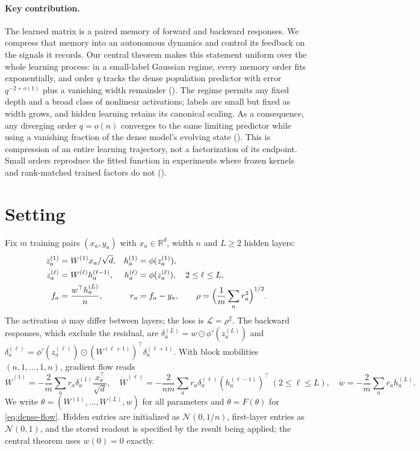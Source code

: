 \documentclass[11pt]{article}
\theoremstyle{definition}
\theoremstyle{remark}
\newcommand{\R}{\mathbb{R}}
\newcommand{\cL}{\mathcal{L}}
\newcommand{\od}{\mathbin{\odot}}
\begin{document}
\paragraph{Key contribution.}
The learned matrix is a paired memory of forward and backward responses.
We compress that memory into an autonomous dynamics and control its feedback
on the signals it records.  Our central theorem makes this statement uniform
over the whole learning process: in a small-label Gaussian regime, every
memory order fits exponentially, and order $q$ tracks the dense population
predictor with error $q^{-2+o(1)}$ plus a vanishing width remainder
().  The regime permits any fixed depth and a broad class
of nonlinear activations; labels are small but fixed as width grows, and
hidden learning retains its canonical scaling.  As a consequence, any
diverging order $q=o(n)$ converges to the same limiting predictor while
using a vanishing fraction of the dense model's evolving state
().  This is compression of an entire learning
trajectory, not a factorization of its endpoint.  Small orders reproduce
the fitted function in experiments where frozen kernels and rank-matched
trained factors do not ().

\section{Setting}
\label{sec:setting}

Fix $m$ training pairs $(x_a,y_a)$ with $x_a\in\R^d$, width $n$ and $L\ge2$
hidden layers:
\begin{align}
 z_a^{(1)}&=W^{(1)}x_a/\sqrt d,& h_a^{(1)}&=\phi(z_a^{(1)}),\nonumber\\
 z_a^{(\ell)}&=W^{(\ell)}h_a^{(\ell-1)},&
 h_a^{(\ell)}&=\phi(z_a^{(\ell)}),\quad 2\le\ell\le L,\\
 f_a&=\frac{w^\top h_a^{(L)}}{n},& r_a&=f_a-y_a,\qquad
 \rho=\Bigl(\frac1m\sum_a r_a^2\Bigr)^{1/2}.\nonumber
\end{align}
The activation $\phi$ may differ between layers; the loss is $\cL=\rho^2$.  The
backward responses, which exclude the residual, are
$\delta_a^{(L)}=w\od\phi'(z_a^{(L)})$ and
$\delta_a^{(\ell)}=\phi'(z_a^{(\ell)})\od(W^{(\ell+1)})^\top\delta_a^{(\ell+1)}$.
With block mobilities $(n,1,\ldots,1,n)$, gradient flow reads
\begin{equation}
 \dot W^{(1)}=-\frac2m\sum_a r_a\delta_a^{(1)}\frac{x_a^\top}{\sqrt d},\quad
 \dot W^{(\ell)}=-\frac{2}{nm}\sum_a r_a\delta_a^{(\ell)}
 (h_a^{(\ell-1)})^\top\ (2\le\ell\le L),\quad
 \dot w=-\frac2m\sum_a r_a h_a^{(L)}.\label{eq:dense-flow}
\end{equation}
We write $\theta=(W^{(1)},\ldots,W^{(L)},w)$ for all parameters and
$\dot\theta=F(\theta)$ for \eqref{eq:dense-flow}.  Hidden entries are initialized
as $\mathcal N(0,1/n)$, first-layer entries as $\mathcal N(0,1)$, and the stored
readout is specified by the result being applied; the central theorem uses
$w(0)=0$ exactly.
\end{document}
